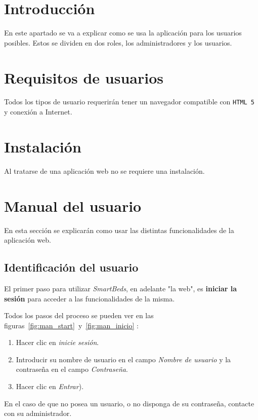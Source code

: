 
\section{Introducción}

En este apartado se va a explicar como se usa la aplicación para los usuarios posibles. Estos se dividen en dos roles, los administradores y los usuarios.

\section{Requisitos de usuarios}

Todos los tipos de usuario requerirán tener un navegador compatible con \texttt{HTML 5} y conexión a Internet.

\section{Instalación}

Al tratarse de una aplicación web no se requiere una instalación.

\section{Manual del usuario}

En esta sección se explicarán como usar las distintas funcionalidades de la aplicación web.

\subsection{Identificación del usuario}

El primer paso para utilizar \textit{SmartBeds}, en adelante "la web", es \textbf{iniciar la sesión} para acceder a las funcionalidades de la misma. 

Todos los pasos del proceso se pueden ver en las figuras~\ref{fig:man_start}~y~\ref{fig:man_inicio} :
\begin{enumerate}
	\item Hacer clic en \textit{inicie sesión}.
	\item Introducir su nombre de usuario en el campo \textit{Nombre de usuario} y la contraseña en el campo \textit{Contraseña}.
	\item Hacer clic en \textit{Entrar}).
\end{enumerate} 

En el caso de que no posea un usuario, o no disponga de su contraseña, contacte con su administrador.

